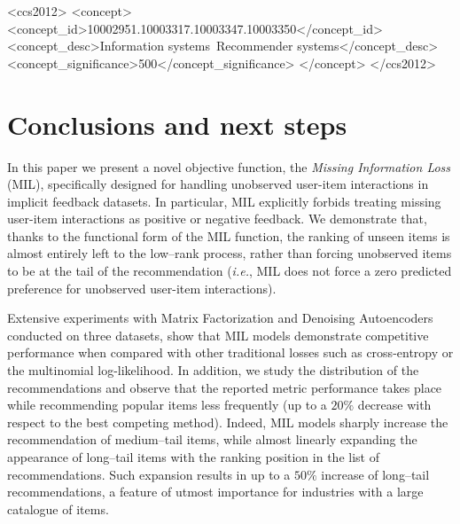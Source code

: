 \documentclass[sigconf]{acmart}
\begin{document}
\begin{CCSXML}
<ccs2012>
<concept>
<concept_id>10002951.10003317.10003347.10003350</concept_id>
<concept_desc>Information systems~Recommender systems</concept_desc>
<concept_significance>500</concept_significance>
</concept>
</ccs2012>
\end{CCSXML}




\maketitle

\setlength{\abovecaptionskip}{0pt}
\setlength{\belowcaptionskip}{-10pt}










\section{Conclusions and next steps}\label{sec:conclusions}

In this paper we present a novel objective function, the \emph{Missing Information Loss} (MIL), specifically designed for handling unobserved user-item interactions in implicit feedback datasets. In particular, MIL explicitly forbids treating missing user-item interactions as positive or negative feedback.
We demonstrate that, thanks to the functional form of the MIL function, the ranking of unseen items is almost entirely left to the low--rank process, rather than forcing unobserved items to be at the tail of the recommendation (\emph{i.e.}, MIL does not force a zero predicted preference for unobserved user-item interactions). 

Extensive experiments with Matrix Factorization and Denoising Autoencoders conducted on three datasets, show that \textsc{MIL} models demonstrate competitive performance when compared with other traditional losses such as cross-entropy or the multinomial log-likelihood. 
In addition, we study the distribution of the recommendations and observe that the reported metric performance takes place while recommending popular items less frequently (up to a $20 \%$ decrease with respect to the best competing method). Indeed, \textsc{MIL} models sharply increase the recommendation of medium--tail items, while almost linearly expanding the appearance of long--tail items with the ranking position in the list of recommendations. Such expansion results in up to a $50 \%$ increase of long--tail recommendations, a feature of utmost importance for industries with a large catalogue of items. 
\end{document}
